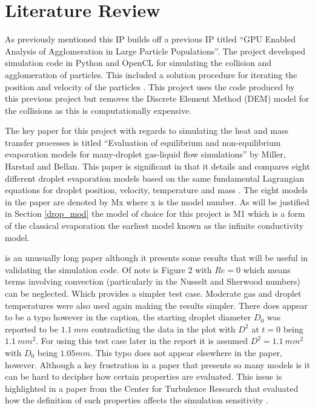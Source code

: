 \documentclass[../Interim_Report_Master]{subfiles}
\begin{document}
\hypertarget{litrev}{\section{Literature Review}\label{litrev}}
As previously mentioned this IP builds off a previous IP titled ``GPU Enabled Analysis of Agglomeration in Large Particle Populations''. The project developed simulation code in Python and OpenCL for simulating the collision and agglomeration of particles. This included a solution procedure for iterating the position and velocity of the particles \cite{Elijah_GPU_Report}. This project uses the code produced by this previous project but removes the Discrete Element Method (DEM) model for the collisions as this is computationally expensive.

The key paper for this project with regards to simulating the heat and mass transfer processes is titled ``Evaluation of equilibrium and non-equilibrium evaporation models for many-droplet gas-liquid flow simulations'' by Miller, Harstad and Bellan. This paper is significant in that it details and compares eight different droplet evaporation models based on the same fundamental Lagrangian equations for droplet position, velocity, temperature and mass \cite{Miller1998}. The eight models in the paper are denoted by Mx where x is the model number. As will be justified in Section \ref{drop_mod} the model of choice for this project is M1 which is a form of the classical evaporation the earliest  model known as the infinite conductivity model. 

\cite{Miller1998} is an unusually long paper although it presents some results that will be useful in validating the simulation code. Of note is Figure 2 with $Re=0$ which means terms involving convection (particularly in the Nusselt and Sherwood numbers) can be neglected. Which provides a simpler test case. Moderate gas and droplet temperatures were also used again making the results simpler. There does appear to be a typo however in the caption, the starting droplet diameter $D_0$ was reported to be $1.1~mm$ contradicting the data in the plot with $D^2$ at $t=0$ being $1.1~mm^2$. For using this test case later in the report it is assumed $D^2=1.1~mm^2$ with $D_0$ being $1.05mm$. This typo does not appear elsewhere in the paper, however. Although a key frustration in a paper that presents so many models is it can be hard to decipher how certain properties are evaluated. This issue is highlighted in a paper from the Center for Turbulence Research that evaluated how the definition of such properties affects the simulation sensitivity \cite{Shashank2011}. 
\end{document}
